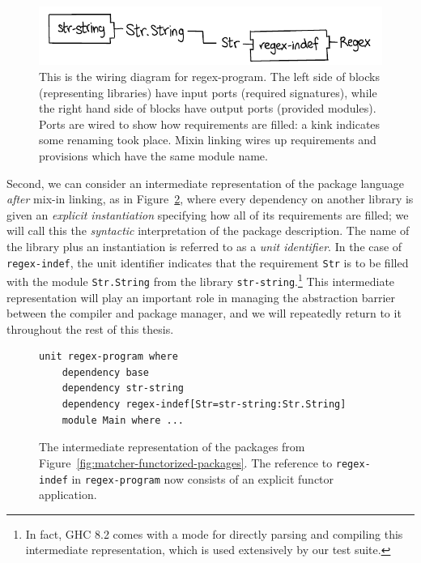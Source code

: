 \begin{figure}
\center%
\includegraphics{figures/regex-indef-instantiated.pdf}
\caption{This is the wiring diagram for regex-program. The left side of blocks
(representing libraries) have input ports (required signatures), while the right hand side
of blocks have output ports (provided modules). Ports are wired to show how requirements are
filled: a kink indicates some renaming took place. Mixin linking wires up requirements
and provisions which have the same module name.}
\label{fig:regex-indef-instantiated}
\end{figure}

Second, we can consider an intermediate representation of the package language
\emph{after} mix-in linking,
as in Figure~\ref{fig:matcher-bkp}, where every dependency on another library
is given an \emph{explicit instantiation} specifying how all of its requirements
are filled; we will call this the \emph{syntactic} interpretation of
the package description. The name of the library plus an instantiation is referred
to as a \emph{unit identifier}.  In the case of \verb|regex-indef|, the
unit identifier indicates that the requirement \verb|Str| is to be filled
with the module \verb|Str.String| from the library \verb|str-string|.\footnote{In
fact, GHC 8.2 comes with a mode for directly parsing and compiling this intermediate
representation, which is used extensively by our test suite.}  This intermediate
representation will play an important role in managing the abstraction barrier
between the compiler and package manager, and we will repeatedly return to
it throughout the rest of this thesis.

\begin{figure}
\begin{verbatim}
unit regex-program where
    dependency base
    dependency str-string
    dependency regex-indef[Str=str-string:Str.String]
    module Main where ...
\end{verbatim}
\caption{The intermediate representation of the packages from Figure~\ref{fig:matcher-functorized-packages}.
The reference to \texttt{regex-indef} in \texttt{regex-program} now consists of an explicit functor application.}
\label{fig:matcher-bkp}
\end{figure}

